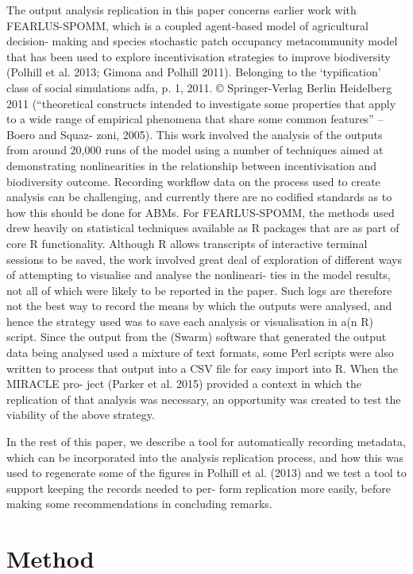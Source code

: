 \documentclass[runningheads]{llncs}
\begin{document}
The output analysis replication in this paper concerns earlier work with
FEARLUS-SPOMM, which is a coupled agent-based model of agricultural decision-
making and species stochastic patch occupancy metacommunity model that has been
used to explore incentivisation strategies to improve biodiversity (Polhill et
al. 2013; Gimona and Polhill 2011). Belonging to the ‘typification’ class of
social simulations adfa, p. 1, 2011.  © Springer-Verlag Berlin Heidelberg 2011
(“theoretical constructs intended to investigate some properties that apply to
a wide range of empirical phenomena that share some common features” – Boero
and Squaz- zoni, 2005). This work involved the analysis of the outputs from
around 20,000 runs of the model using a number of techniques aimed at
demonstrating nonlinearities in the relationship between incentivisation and
biodiversity outcome.  Recording workflow data on the process used to create
analysis can be challenging, and currently there are no codified standards as
to how this should be done for ABMs. For FEARLUS-SPOMM, the methods used drew
heavily on statistical techniques available as R packages that are as part of
core R functionality. Although R allows transcripts of interactive terminal
sessions to be saved, the work involved great deal of exploration of different
ways of attempting to visualise and analyse the nonlineari- ties in the model
results, not all of which were likely to be reported in the paper. Such logs
are therefore not the best way to record the means by which the outputs were
analysed, and hence the strategy used was to save each analysis or
visualisation in a(n R) script. Since the output from the (Swarm) software that
generated the output data being analysed used a mixture of text formats, some
Perl scripts were also written to process that output into a CSV file for easy
import into R. When the MIRACLE pro- ject (Parker et al. 2015) provided a
context in which the replication of that analysis was necessary, an opportunity
was created to test the viability of the above strategy.

In the rest of this paper, we describe  a tool for automatically recording
metadata, which can be incorporated into the analysis replication process, and
how this  was used to regenerate some of the figures in Polhill et al. (2013)
and we test a tool to support keeping the records needed to per- form
replication more easily, before making some recommendations in concluding
remarks.

\section{Method}
\end{document}
